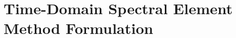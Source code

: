 
\chapter[Time-Domain Spectral Element Method Formulation]{Time-Domain Spectral Element Method Formulation}
\label{ch:sem}



%
%
%
%
%
%
%
%

